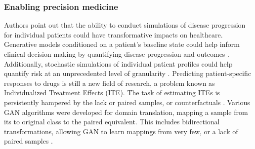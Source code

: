     \subsubsection{Enabling precision medicine}\label{sec:precision_med}
    Authors point out that the ability to conduct simulations of disease progression for individual patients could have transformative impacts on healthcare. Generative models conditioned on a patient's baseline state could help inform clinical decision making by quantifying disease progression and outcomes \cite{walsh2020generating, Fisher2019}. Additionally, stochastic simulations of individual patient profiles could help quantify risk at an unprecedented level of granularity \cite{Fisher2019}. Predicting patient-specific responses to drugs is still a new field of research, a problem known as Individualized Treatment Effects (ITE). The task of estimating ITEs is persistently hampered by the lack or paired samples, or counterfactuals \cite{Yoon2018-mo, chu2019treatment}. Various GAN algorithms were developed for domain translation, mapping a sample from its to original class to the paired equivalent. This includes bidirectional transformations, allowing GAN to learn mappings from very few, or a lack of paired samples \cite{Wolterink2017DeepMT}.
    
